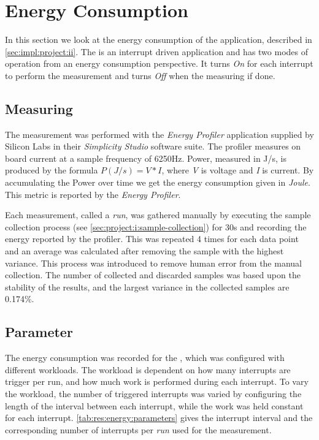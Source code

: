 \section{Energy Consumption}
\label{sec:res:energy}

In this section we look at the energy consumption of the {\tracker} application, described in \autoref{sec:impl:project:ii}.
The {\tracker} is an interrupt driven application and has two modes of operation from an energy consumption perspective.
It turns \emph{On} for each interrupt to perform the measurement and turns \emph{Off} when the measuring if done.

\subsection{Measuring}
The measurement was performed with the \emph{Energy Profiler} application supplied by Silicon Labs in their \emph{Simplicity Studio} software suite.
The profiler measures on board current at a sample frequency of 6250Hz.
Power, measured in J/s, is produced by the formula $P (J/s) = V*I $, where \emph{V} is voltage and \emph{I} is current.
By accumulating the Power over time we get the energy consumption given in \emph{Joule}.
This metric is reported by the \emph{Energy Profiler}.

Each measurement, called a \emph{run}, was gathered manually by executing the sample collection process (see \autoref{sec:project:i:sample-collection}) for 30s and recording the energy reported by the profiler.
This was repeated 4 times for each data point and an average was calculated after removing the sample with the highest variance.
This process was introduced to remove human error from the manual collection.
The number of collected and discarded samples was based upon the stability of the results, and the largest variance in the collected samples are 0.174\%.

\subsection{Parameter}

The energy consumption was recorded for the {\tracker}, which was configured with different workloads.
The workload is dependent on how many interrupts are trigger per run, and how much work is performed during each interrupt.
To vary the workload, the number of triggered interrupts was varied by configuring the length of the interval between each interrupt, while the work was held constant for each interrupt.
\autoref{tab:res:energy:parameters} gives the interrupt interval and the corresponding number of interrupts per \emph{run} used for the measurement.

